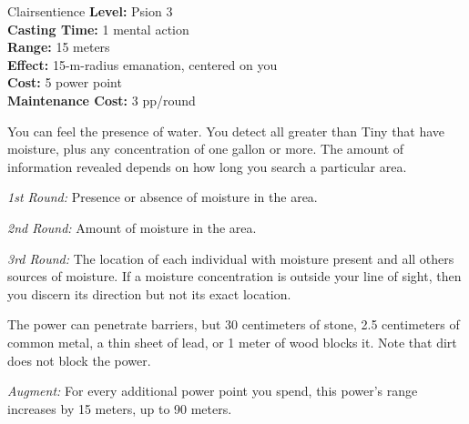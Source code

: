 {Clairsentience}
{
	\textbf{Level:}
	Psion 3\\
	\textbf{Casting Time:}
	1 mental action\\
	\textbf{Range:}
	15 meters\\
	\textbf{Effect:}
	15-m-radius emanation, centered on you\\
	\textbf{Cost:}
	5 power point\\
	\textbf{Maintenance Cost:}
	3 pp/round\\
}
{
	You can feel the presence of water. You detect all greater than Tiny that have moisture, plus any concentration of one gallon or more. The amount of information revealed depends on how long you search a particular area.

	\textit{1st Round:} Presence or absence of moisture in the area.

	\textit{2nd Round:} Amount of moisture in the area.

	\textit{3rd Round:} The location of each individual with moisture present and all others sources of moisture. If a moisture concentration is outside your line of sight, then you discern its direction but not its exact location.

	The power can penetrate barriers, but 30 centimeters of stone, 2.5 centimeters of common metal, a thin sheet of lead, or 1 meter of wood blocks it. Note that dirt does not block the power.

	\textit{Augment:} For every additional power point you spend, this power's range increases by 15 meters, up to 90 meters.
}